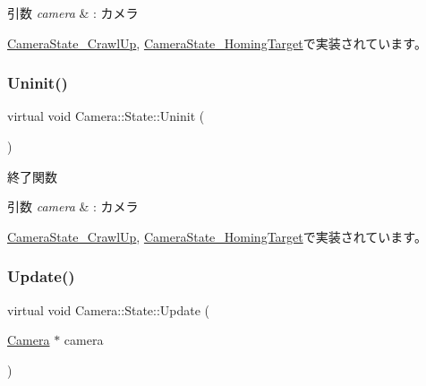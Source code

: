 \begin{DoxyParams}{引数}
{\em camera} & \+: カメラ \\
\hline
\end{DoxyParams}


\mbox{\hyperlink{class_camera_state___crawl_up_a43a47eb4e7445c6801e8316c5a635709}{Camera\+State\+\_\+\+Crawl\+Up}}, \mbox{\hyperlink{class_camera_state___homing_target_a9222190a5f26d564e99623b05941d382}{Camera\+State\+\_\+\+Homing\+Target}}で実装されています。

\mbox{\label{class_camera_1_1_state_adb3f43b6c3f8100da7877867180e804b}} 
\subsubsection{\texorpdfstring{Uninit()}{Uninit()}}
{\footnotesize\ttfamily virtual void Camera\+::\+State\+::\+Uninit (\begin{DoxyParamCaption}{ }\end{DoxyParamCaption})\hspace{0.3cm}{\ttfamily [pure virtual]}}



終了関数 


\begin{DoxyParams}{引数}
{\em camera} & \+: カメラ \\
\hline
\end{DoxyParams}


\mbox{\hyperlink{class_camera_state___crawl_up_a046ec18a91e31b210ae000133fa6113a}{Camera\+State\+\_\+\+Crawl\+Up}}, \mbox{\hyperlink{class_camera_state___homing_target_ab2b5379b35ebafc53189bf4d45646c8c}{Camera\+State\+\_\+\+Homing\+Target}}で実装されています。

\mbox{\label{class_camera_1_1_state_a2d41e0cb783666bae6c6ea167fcc7874}} 
\subsubsection{\texorpdfstring{Update()}{Update()}}
{\footnotesize\ttfamily virtual void Camera\+::\+State\+::\+Update (\begin{DoxyParamCaption}\item[{\mbox{\hyperlink{class_camera}{Camera}} $\ast$}]{camera }\end{DoxyParamCaption})\hspace{0.3cm}{\ttfamily [pure virtual]}}



